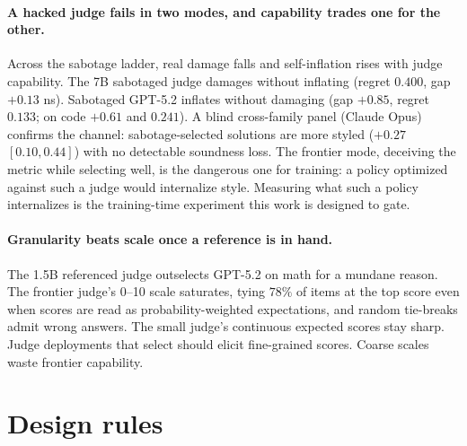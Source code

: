 \documentclass[11pt]{article}
\begin{document}
\paragraph{A hacked judge fails in two modes, and capability trades one for the other.}
Across the sabotage ladder, real damage falls and self-inflation rises with judge capability.
The 7B sabotaged judge damages without inflating (regret $0.400$, gap $+0.13$ ns).
Sabotaged GPT-5.2 inflates without damaging (gap $+0.85$, regret $0.133$; on code $+0.61$ and $0.241$).
A blind cross-family panel (Claude Opus) confirms the channel: sabotage-selected solutions are more styled ($+0.27$ $[0.10, 0.44]$) with no detectable soundness loss.
The frontier mode, deceiving the metric while selecting well, is the dangerous one for training: a policy optimized against such a judge would internalize style.
Measuring what such a policy internalizes is the training-time experiment this work is designed to gate.

\paragraph{Granularity beats scale once a reference is in hand.}
The 1.5B referenced judge outselects GPT-5.2 on math for a mundane reason.
The frontier judge's 0--10 scale saturates, tying $78\%$ of items at the top score even when scores are read as probability-weighted expectations, and random tie-breaks admit wrong answers.
The small judge's continuous expected scores stay sharp.
Judge deployments that select should elicit fine-grained scores.
Coarse scales waste frontier capability.

\section{Design rules}
\label{sec:rules}
\end{document}
